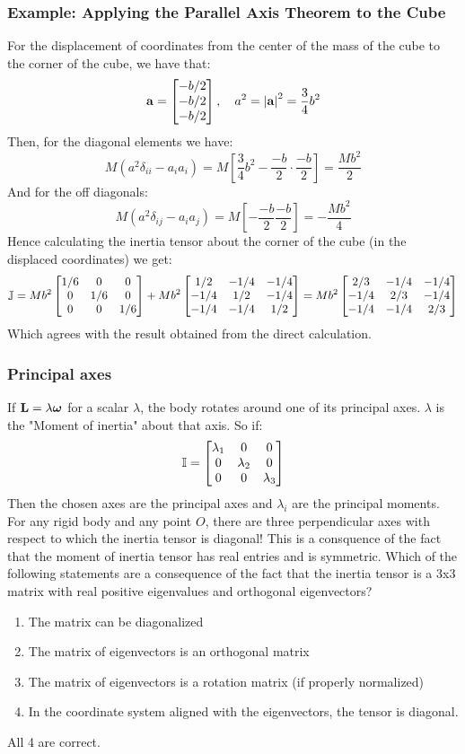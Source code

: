 \subsubsection{Example: Applying the Parallel Axis Theorem to the Cube}
For the displacement of coordinates from the center of the mass of the cube to the corner of the cube, we have that:
\[\mathbf{a} = \begin{bmatrix}-b/2 \\ -b/2 \\ -b/2\end{bmatrix}, \quad a^2 = \abs{\mathbf{a}}^2 = \frac{3}{4}b^2\]
Then, for the diagonal elements we have:
\[M(a^2\delta_{ii} - a_ia_i) = M\left[\frac{3}{4}b^2 - \frac{-b}{2}\cdot\frac{-b}{2}\right] = \frac{Mb^2}{2}\]
And for the off diagonals:
\[M(a^2\delta_{ij} - a_ia_j) = M\left[-\frac{-b}{2}\frac{-b}{2}\right] = -\frac{Mb^2}{4}\]
Hence calculating the inertia tensor about the corner of the cube (in the displaced coordinates) we get:
\[\mathbb{J} = Mb^2\begin{bmatrix}1/6 & 0 & 0 \\ 0 & 1/6 & 0 \\ 0 & 0 & 1/6\end{bmatrix} + Mb^2\begin{bmatrix}1/2 & -1/4 & -1/4 \\ -1/4 & 1/2 & -1/4 \\ -1/4 & -1/4 & 1/2\end{bmatrix} = Mb^2\begin{bmatrix}2/3 & -1/4 & -1/4 \\ -1/4 & 2/3 & -1/4 \\ -1/4 & -1/4 & 2/3\end{bmatrix}\]
Which agrees with the result obtained from the direct calculation.

\subsubsection{Principal axes}
If $\mathbf{L} = \lambda\bm{\omega}$ for a scalar $\lambda$, the body rotates around one of its principal axes. $\lambda$ is the "Moment of inertia" about that axis. So if:
\[\mathbb{I} = \begin{bmatrix}\lambda_1 & 0 & 0 \\ 0 & \lambda_2 & 0 \\ 0 & 0 & \lambda_3\end{bmatrix}\]
Then the chosen axes are the principal axes and $\lambda_i$ are the principal moments. For any rigid body and any point $O$, there are three perpendicular axes with respect to which the inertia tensor is diagonal! This is a consquence of the fact that the moment of inertia tensor has real entries and is symmetric. 
\newline Which of the following statements are a consequence of the fact that the inertia tensor is a 3x3 matrix with real positive eigenvalues and orthogonal eigenvectors?
\begin{enumerate}
    \item The matrix can be diagonalized
    \item The matrix of eigenvectors is an orthogonal matrix
    \item The matrix of eigenvectors is a rotation matrix (if properly normalized)
    \item In the coordinate system aligned with the eigenvectors, the tensor is diagonal.
\end{enumerate}
\begin{s}
    All 4 are correct. 
\end{s}